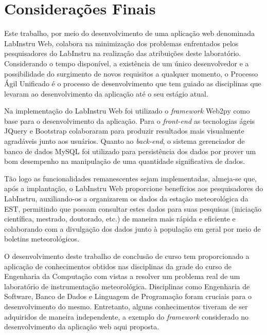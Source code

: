 \chapter{Considerações Finais} \label{cap:consideracoes}

Este trabalho, por meio do desenvolvimento de uma aplicação web denominada LabInstru Web, colabora na minimização dos problemas enfrentados pelos pesquisadores do LabInstru na realização das atribuições deste laboratório. Considerando o tempo disponível, a existência de um único desenvolvedor e a possibilidade do surgimento de novos requisitos a qualquer momento, o Processo Ágil Unificado é o processo de desenvolvimento que tem guiado as disciplinas que levaram ao desenvolvimento da aplicação até o seu estágio atual.

Na implementação do LabInstru Web foi utilizado o \emph{framework} Web2py como base para o desenvolvimento da aplicação. Para o \emph{front-end} as tecnologias ágeis JQuery e Bootstrap colaboraram para produzir resultados mais visualmente agradáveis junto aos usuários.  Quanto ao \emph{back-end}, o sistema gerenciador de banco de dados MySQL foi utilizado para persistência dos dados por prover um bom desempenho na manipulação de uma quantidade significativa de dados.

Tão logo as funcionalidades remanescentes sejam implementadas, almeja-se que, após a implantação, o LabInstru Web proporcione benefícios aos pesquisadores do LabInstru, auxiliando-os a organizarem os dados da estação meteorológica da EST, permitindo que possam consultar estes dados para suas pesquisas (iniciação científica, mestrado, doutorado, etc.) de maneira mais rápida e eficiente e colaborando com a divulgação dos dados junto à população em geral por meio de boletins meteorológicos.

O desenvolvimento deste trabalho de conclusão de curso tem proporcionado a aplicação de conhecimentos obtidos nas disciplinas da grade do curso de Engenharia da Computação com vistas a resolver um problema real de um laboratório de instrumentação meteorológica. Disciplinas como Engenharia de Software, Banco de Dados e Linguagem de Programação foram cruciais para o desenvolvimento do mesmo. Entretanto, alguns conhecimentos tiveram de ser adquiridos de maneira independente, a exemplo do \emph{framework} considerado no desenvolvimento da aplicação web aqui proposta.
